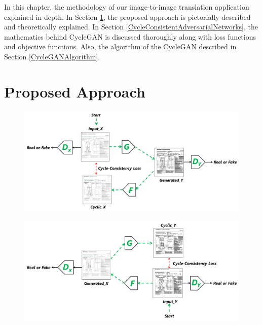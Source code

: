 \justifying
\setlength{\parskip}{1em}

In this chapter, the methodology of our image-to-image translation application explained in depth. In Section \ref{ProposedApproach}, the proposed approach is pictorially described and theoretically explained. In Section \ref{CycleConsistentAdversarialNetworks}, the mathematics behind \ac{CycleGAN} is discussed thoroughly along with loss functions and objective functions. Also, the algorithm of the \ac{CycleGAN} described in Section \ref{CycleGANAlgorithm}.

\section{Proposed Approach}\label{ProposedApproach}


\begin{figure}[H]
        \begin{center}
    	\includegraphics[scale=0.20]{images/Methodology/Gxy.png}
	    \caption[]{}
	    \label{fig:Gxy}
	    \end{center}
\end{figure}



\begin{figure}[H]
        \begin{center}
    	\includegraphics[scale=0.20]{images/Methodology/Fyx.png}
	    \caption[]{}
	    \label{fig:Fyx}
	    \end{center}
\end{figure}


